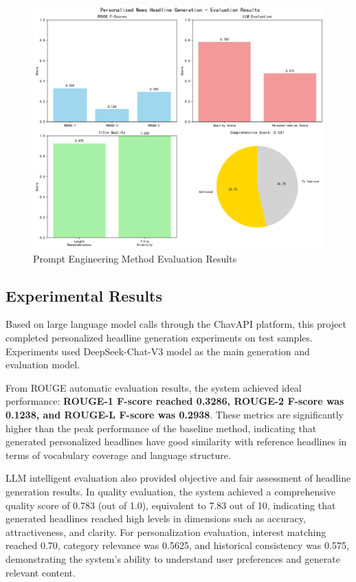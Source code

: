 \documentclass[10pt,a4paper]{article}
\begin{document}
\begin{figure}[H]
  \centering
  \includegraphics[width=\textwidth]{fig/evaluation_chart_20250622_212308.png}   
  \caption{Prompt Engineering Method Evaluation Results}\label{fig:prompt_evaluation}
\end{figure}

\subsection{Experimental Results}
Based on large language model calls through the ChavAPI platform, this project completed personalized headline generation experiments on test samples. Experiments used DeepSeek-Chat-V3 model as the main generation and evaluation model.

From ROUGE automatic evaluation results, the system achieved ideal performance: \textbf{ROUGE-1 F-score reached 0.3286, ROUGE-2 F-score was 0.1238, and ROUGE-L F-score was 0.2938}. These metrics are significantly higher than the peak performance of the baseline method, indicating that generated personalized headlines have good similarity with reference headlines in terms of vocabulary coverage and language structure.

LLM intelligent evaluation also provided objective and fair assessment of headline generation results. In quality evaluation, the system achieved a comprehensive quality score of 0.783 (out of 1.0), equivalent to 7.83 out of 10, indicating that generated headlines reached high levels in dimensions such as accuracy, attractiveness, and clarity. For personalization evaluation, interest matching reached 0.70, category relevance was 0.5625, and historical consistency was 0.575, demonstrating the system's ability to understand user preferences and generate relevant content.
\end{document}
